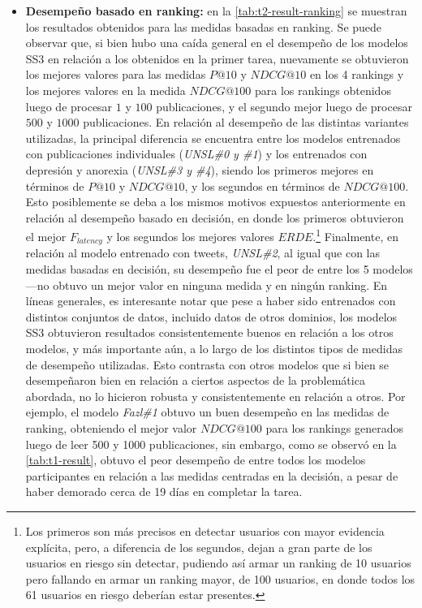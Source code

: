 \begin{itemize}
    \item \textbf{Desempeño basado en ranking:} en la \autoref{tab:t2-result-ranking} se muestran los resultados obtenidos para las medidas basadas en ranking.
    Se puede observar que, si bien hubo una caída general en el desempeño de los modelos SS3 en relación a los obtenidos en la primer tarea, nuevamente se obtuvieron los mejores valores para las medidas $P@10$ y $NDCG@10$ en los 4 rankings y los mejores valores en la medida $NDCG@100$ para los rankings obtenidos luego de procesar $1$ y $100$ publicaciones, y el segundo mejor luego de procesar $500$ y $1000$ publicaciones.
    En relación al desempeño de las distintas variantes utilizadas, la principal diferencia se encuentra entre los modelos entrenados con publicaciones individuales (\emph{UNSL\#0 y \#1}) y los entrenados con depresión y anorexia (\emph{UNSL\#3 y \#4}), siendo los primeros mejores en términos de $P@10$ y $NDCG@10$, y los segundos en términos de $NDCG@100$.
    Esto posiblemente se deba a los mismos motivos expuestos anteriormente en relación al desempeño basado en decisión, en donde los primeros obtuvieron el mejor $F_{latency}$ y los segundos los mejores valores $ERDE$.\footnote{Los primeros son más precisos en detectar usuarios con mayor evidencia explícita, pero, a diferencia de los segundos, dejan a gran parte de los usuarios en riesgo sin detectar, pudiendo así armar un ranking de 10 usuarios pero fallando en armar un ranking mayor, de 100 usuarios, en donde todos los 61 usuarios en riesgo deberían estar presentes.}
    Finalmente, en relación al modelo entrenado con tweets, \emph{UNSL\#2}, al igual que con las medidas basadas en decisión, su desempeño fue el peor de entre los 5 modelos ---no obtuvo un mejor valor en ninguna medida y en ningún ranking.
    En líneas generales, es interesante notar que pese a haber sido entrenados con distintos conjuntos de datos, incluido datos de otros dominios, los modelos SS3 obtuvieron resultados consistentemente buenos en relación a los otros modelos, y más importante aún, a lo largo de los distintos tipos de medidas de desempeño utilizadas.
    Esto contrasta con otros modelos que si bien se desempeñaron bien en relación a ciertos aspectos de la problemática abordada, no lo hicieron robusta y consistentemente en relación a otros.
    Por ejemplo, el modelo \emph{Fazl\#1} obtuvo un buen desempeño en las medidas de ranking, obteniendo el mejor valor $NDCG@100$ para los rankings generados luego de leer 500 y 1000 publicaciones, sin embargo, como se observó en la \autoref{tab:t1-result}, obtuvo el peor desempeño de entre todos los modelos participantes en relación a las medidas centradas en la decisión, a pesar de haber demorado cerca de 19 días en completar la tarea.

\end{itemize}
